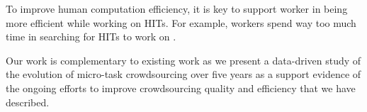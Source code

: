 \cite{finishthem,scaleup}

To improve human computation efficiency, it is key to support worker in being more efficient while working on HITs. For example, workers spend way too much time in searching for HITs to work on \cite{Kucherbaev:2014:TET:2598153.2602249}.






Our work is complementary to existing work as we present a data-driven study of the evolution of micro-task crowdsourcing over five years as a support evidence of the ongoing efforts to improve crowdsourcing quality and efficiency that we have described.